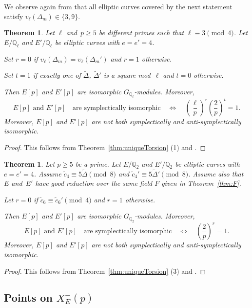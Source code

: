 \documentclass[12pt]{amsart}
\numberwithin{equation}{section}
\newtheorem{theorem}[equation]{Theorem}
\theoremstyle{definition}
\newcommand{\Q}{\mathbb{Q}}
\newcommand{\Xp}{X_E^{-}(p)}
\begin{document}
We observe again from \cite[Table 5]{symplectic} that all elliptic curves covered by the next statement satisfy $v_\ell(\Delta_m) \in \{3,9\}$.

\begin{theorem} Let $\ell$ and~$p \geq 5$ be different primes such that $\ell \equiv 3 \pmod{4}$.
Let $E/\Q_\ell$ and $E'/\Q_\ell$ be elliptic curves with  $e=e'=4$.

Set $r=0$ if $\upsilon_\ell(\Delta_m) = \upsilon_\ell(\Delta_m')$  and $r=1$ otherwise.

Set $t=1$ if exactly one of $\tilde{\Delta}$, $\tilde{\Delta}'$ is a square mod~$\ell$ and $t=0$ otherwise.

Then $E[p]$ and $E'[p]$ are isomorphic $G_{\Q_{\ell}}$-modules. Moreover,
\[
 E[p] \text{ and } E'[p] \quad \text{are symplectically isomorphic} \quad \Leftrightarrow \quad \left(\frac{\ell}{p}\right)^r \left (\frac{2}{p} \right)^t = 1.
\]
\label{T:mainTame4}
Moreover, $E[p]$ and $E'
[p]$ are not both symplectically and anti-symplectically isomorphic.
\end{theorem}
\begin{proof} This follows from Theorem~\ref{thm:uniqueTorsion} (1) 
and \cite[Theorem 5]{symplectic}. 
\end{proof}

\begin{theorem} Let $p \geq 5$ be a prime.
Let $E/\Q_2$ and $E'/\Q_2$ be elliptic curves with $e=e'=4$.
Assume $\tilde{c}_4 \equiv 5\tilde{\Delta} \pmod{8}$ and $\tilde{c}_4' \equiv 5\tilde{\Delta}' \pmod{8}$. Assume also that $E$ and~$E'$ have good reduction over the same field $F$ given in Theorem~\ref{thm:F}.


Let $r=0$ if $\tilde{c}_6 \equiv \tilde{c}_6' \pmod{4}$ and $r=1$ otherwise.


Then $E[p]$ and $E'[p]$ are isomorphic $G_{\Q_2}$-modules. Moreover,
\[
 E[p] \text{ and } E'[p] \quad \text{are symplectically isomorphic} \quad \Leftrightarrow \quad \left (\frac{2}{p} \right)^r = 1.
\]
\label{T:mainWild4}
Moreover, $E[p]$ and $E'
[p]$ are not both symplectically and anti-symplectically isomorphic.
\end{theorem}
\begin{proof} This follows from Theorem~\ref{thm:uniqueTorsion} (3) 
and \cite[Theorem 6]{symplectic}. 
\end{proof}

\subsection{Points on \texorpdfstring{$\Xp$}{}}
\end{document}
